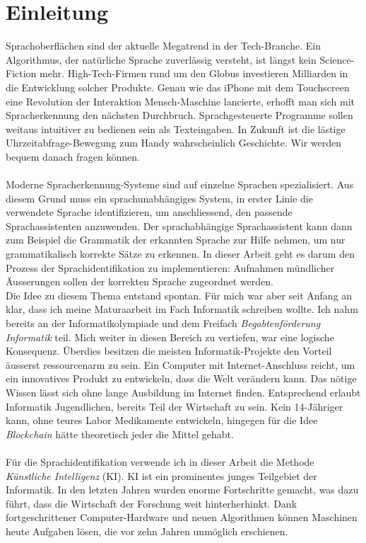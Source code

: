 \section{Einleitung}
Sprachoberflächen sind der aktuelle Megatrend in der Tech-Branche. Ein Algorithmus, der natürliche Sprache zuverlässig versteht, ist längst kein Science-Fiction mehr. High-Tech-Firmen rund um den Globus investieren Milliarden in die Entwicklung solcher Produkte. Genau wie das iPhone mit dem Touchscreen eine Revolution der Interaktion Mensch-Maschine lancierte, erhofft man sich mit Spracherkennung den nächsten Durchbruch. Sprachgesteuerte Programme sollen weitaus intuitiver zu bedienen sein als Texteingaben. In Zukunft ist die lästige Uhrzeitabfrage-Bewegung zum Handy wahrscheinlich Geschichte. Wir werden bequem danach fragen können.
\\ \\
Moderne Spracherkennung-Systeme sind auf einzelne Sprachen spezialisiert. Aus diesem Grund muss ein sprachunabhängiges System, in erster Linie die verwendete Sprache identifizieren, um anschliessend, den passende Sprachassistenten anzuwenden. Der sprachabhängige Sprachassistent kann dann zum Beispiel die Grammatik der erkannten Sprache zur Hilfe nehmen, um nur grammatikalisch korrekte Sätze zu erkennen. In dieser Arbeit geht es darum den Prozess der Sprachidentifikation zu implementieren:  Aufnahmen mündlicher Äusserungen sollen der korrekten Sprache zugeordnet werden. 
\\ 
Die Idee zu diesem Thema entstand spontan. Für mich war aber seit Anfang an klar, dass ich meine Maturaarbeit im Fach Informatik schreiben wollte. Ich nahm bereits an der Informatikolympiade und dem Freifach \textit{Begabtenförderung Informatik} teil. Mich weiter in diesen Bereich zu vertiefen, war eine logische Konsequenz. Überdies besitzen die meisten Informatik-Projekte den Vorteil äusserst ressourcenarm zu sein. Ein Computer mit Internet-Anschluss reicht, um ein innovatives Produkt zu entwickeln, dass die Welt verändern kann. Das nötige Wissen lässt sich ohne lange Ausbildung im Internet finden. Entsprechend erlaubt Informatik Jugendlichen, bereits Teil der Wirtschaft zu sein. Kein 14-Jähriger kann, ohne teures Labor Medikamente entwickeln, hingegen für die Idee \textit{Blockchain} hätte theoretisch jeder die Mittel gehabt.
\\ \\
Für die Sprachidentifikation verwende ich in dieser Arbeit die Methode \textit{Künstliche Intelligenz} (KI). KI ist ein prominentes junges Teilgebiet der Informatik. In den letzten Jahren wurden enorme Fortschritte gemacht, was dazu führt, dass die Wirtschaft der Forschung weit hinterherhinkt. Dank fortgeschrittener Computer-Hardware und neuen Algorithmen können Maschinen heute Aufgaben lösen, die vor zehn Jahren unmöglich erschienen.

